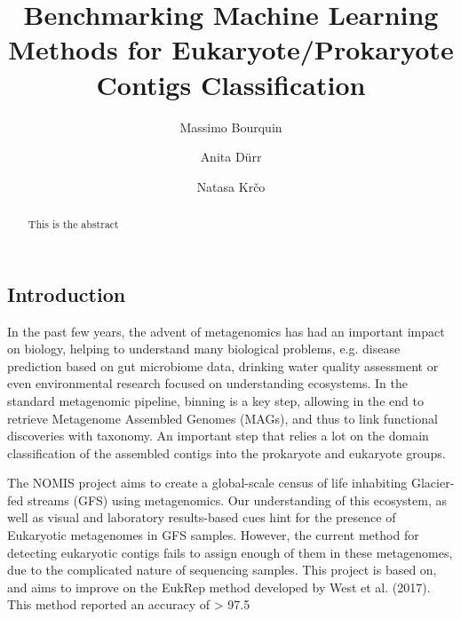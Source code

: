 \documentclass{article}
\begin{document}
	\title{Benchmarking Machine Learning Methods for Eukaryote/Prokaryote Contigs Classification }
	
	\author{Massimo Bourquin \and Anita D\" urr \and Natasa Kr\v co}
	
	\maketitle
	
	\begin{abstract}
		This is the abstract
	\end{abstract}
	
	\begin{multicols}{2}
		
		\section{Introduction}	
		
		In the past few years, the advent of metagenomics has had an important impact on biology, helping to understand many biological problems, e.g. disease prediction based on gut microbiome data, drinking water quality assessment or even environmental research focused on understanding ecosystems. In the standard metagenomic pipeline, binning is a key step, allowing in the end to retrieve Metagenome Assembled Genomes (MAGs), and thus to link functional discoveries with taxonomy. An important step that relies a lot on the domain classification of the assembled contigs into the prokaryote and eukaryote groups. 
		
		The NOMIS project aims to create a global-scale census of life inhabiting Glacier-fed streams (GFS) using metagenomics. Our understanding of this ecosystem, as well as visual and laboratory results-based cues hint for the presence of Eukaryotic metagenomes in GFS samples. However, the current method for detecting eukaryotic contigs fails to assign enough of them in these metagenomes, due to the complicated nature of sequencing samples. This project is based on, and aims to improve on the EukRep method developed by West et al. (2017). This method reported an accuracy  of  > 97.5%
		

\end{multicols}
\end{document}
